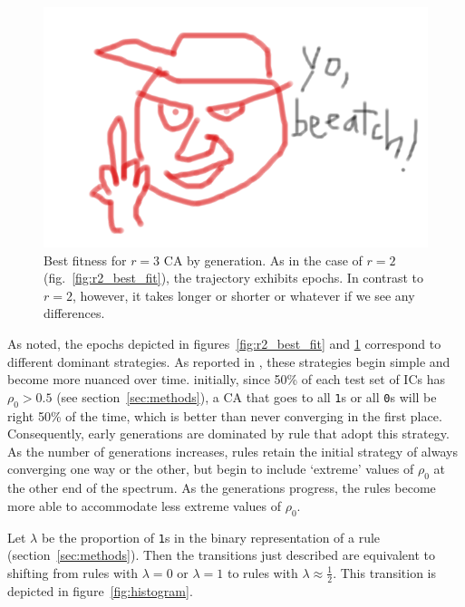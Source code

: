 \begin{figure} [h]
\begin{center}
\includegraphics[width=\linewidth]{foo.png}
\caption{Best fitness for $r = 3$ CA by generation. As in the case of $r = 2$ (fig.~\ref{fig:r2_best_fit}), the trajectory exhibits epochs. In contrast to $r = 2$, 
however, it takes longer or shorter or whatever if we see any differences.}
\label{fig:r3_best_fit}
\end{center}
\end{figure}

As noted, the epochs depicted in figures~\ref{fig:r2_best_fit} and \ref{fig:r3_best_fit} correspond to different dominant strategies. As reported in 
\cite{Mitchell:1994:ECA:186092.186116}, these strategies begin simple and become more nuanced over time. initially, since 50\% of each test set of ICs 
has $\rho_0 > 0.5$ (see section~\ref{sec:methods}), a CA that goes to all \texttt{1}s or all \texttt{0}s will be right 50\% of the time, which is better than never converging in the first place. Consequently, early generations are dominated by rule that adopt this strategy. As the number of generations increases, 
rules retain the initial strategy of always converging one way or the other, but begin to include `extreme' values of $\rho_0$ at the other end of the spectrum. 
As the generations progress, the rules become more able to accommodate less extreme values of $\rho_0$.

Let $\lambda$ be the proportion of \texttt{1}s in the binary representation of a rule (section~\ref{sec:methods}). Then the transitions just described are 
equivalent to shifting from rules with $\lambda = 0$ or $\lambda = 1$ to rules with $\lambda \approx \frac{1}{2}$. This transition is depicted in 
figure~\ref{fig:histogram}.

